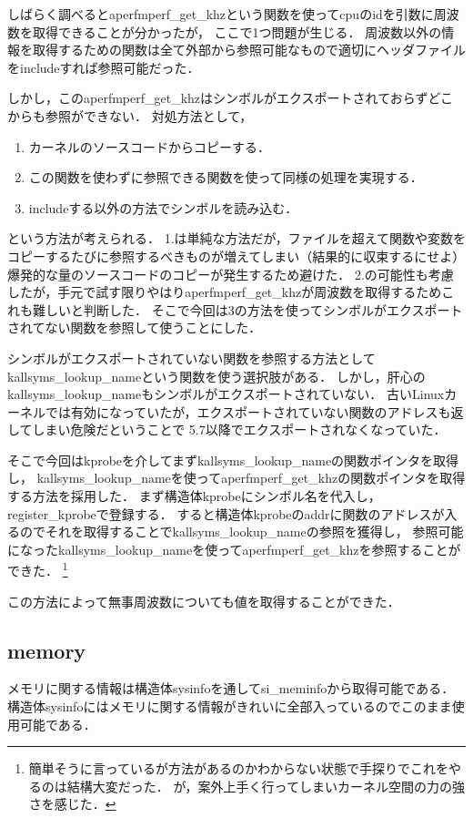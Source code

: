 しばらく調べるとaperfmperf\_get\_khzという関数を使ってcpuのidを引数に周波数を取得できる\cite{aperf}ことが分かったが，
ここで1つ問題が生じる．
周波数以外の情報を取得するための関数は全て外部から参照可能なもので適切にヘッダファイルをincludeすれば参照可能だった．

しかし，このaperfmperf\_get\_khzはシンボルがエクスポートされておらずどこからも参照ができない．
対処方法として，
\begin{enumerate}
    \item カーネルのソースコードからコピーする．
    \item この関数を使わずに参照できる関数を使って同様の処理を実現する．
    \item includeする以外の方法でシンボルを読み込む．
\end{enumerate}

という方法が考えられる．
1.は単純な方法だが，ファイルを超えて関数や変数をコピーするたびに参照するべきものが増えてしまい（結果的に収束するにせよ）
爆発的な量のソースコードのコピーが発生するため避けた．
2.の可能性も考慮したが，手元で試す限りやはりaperfmperf\_get\_khzが周波数を取得するためこれも難しいと判断した．
そこで今回は3の方法を使ってシンボルがエクスポートされてない関数を参照して使うことにした．

シンボルがエクスポートされていない関数を参照する方法としてkallsyms\_lookup\_nameという関数を使う選択肢がある．
しかし，肝心のkallsyms\_lookup\_nameもシンボルがエクスポートされていない．
古いLinuxカーネルでは有効になっていたが，エクスポートされていない関数のアドレスも返してしまい危険だということで
5.7以降でエクスポートされなくなっていた．\cite{kallsyms}

そこで今回はkprobeを介してまずkallsyms\_lookup\_nameの関数ポインタを取得し，
kallsyms\_lookup\_nameを使ってaperfmperf\_get\_khzの関数ポインタを取得する方法を採用した．
まず構造体kprobeにシンボル名を代入し，register\_kprobeで登録する．
すると構造体kprobeのaddrに関数のアドレスが入るのでそれを取得することでkallsyms\_lookup\_nameの参照を獲得し，
参照可能になったkallsyms\_lookup\_nameを使ってaperfmperf\_get\_khzを参照することができた．
\footnote{簡単そうに言っているが方法があるのかわからない状態で手探りでこれをやるのは結構大変だった．
が，案外上手く行ってしまいカーネル空間の力の強さを感じた．}

この方法によって無事周波数についても値を取得することができた．

\subsection{memory}
メモリに関する情報は構造体sysinfoを通してsi\_meminfoから取得可能である．\cite{meminfo}
構造体sysinfoにはメモリに関する情報がきれいに全部入っているのでこのまま使用可能である．

